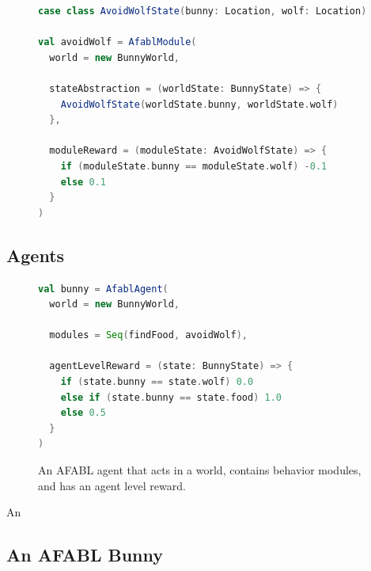 \begin{figure}[ht]
\begin{center}

\begin{lstlisting}[language=Scala]
case class AvoidWolfState(bunny: Location, wolf: Location)

val avoidWolf = AfablModule(
  world = new BunnyWorld,

  stateAbstraction = (worldState: BunnyState) => {
    AvoidWolfState(worldState.bunny, worldState.wolf)
  },

  moduleReward = (moduleState: AvoidWolfState) => {
    if (moduleState.bunny == moduleState.wolf) -0.1
    else 0.1
  }
)
\end{lstlisting}

\caption{}
\end{center}
\label{fig:avoid-wolf-code}
\end{figure}


\subsection{Agents}

\begin{figure}[ht]
\begin{center}

\begin{lstlisting}[language=Scala]
val bunny = AfablAgent(
  world = new BunnyWorld,

  modules = Seq(findFood, avoidWolf),

  agentLevelReward = (state: BunnyState) => {
    if (state.bunny == state.wolf) 0.0
    else if (state.bunny == state.food) 1.0
    else 0.5
  }
)
\end{lstlisting}

\caption{An AFABL agent that acts in a world, contains behavior modules, and has an agent level reward.}
\end{center}
\label{fig:avoid-wolf-code}
\end{figure}

An

\subsection{An AFABL Bunny}

